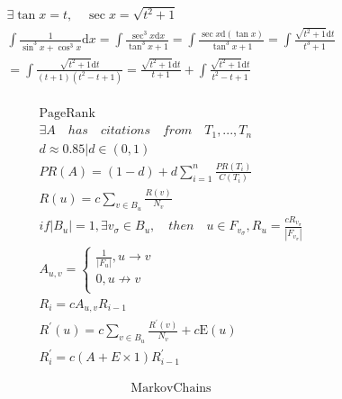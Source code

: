 \documentclass{article}
\begin{document}
\begin{align*}
    \exists \tan x = t, \quad \sec x = \sqrt{t^2+1}\\ 
    \int \frac{1}{\sin^3 x + \cos^3 x} \mathrm{d}x = \int \frac{\sec^3 x\mathrm{d}x}{\tan^3 x+1} = \int \frac{\sec x\mathrm{d}(\tan x)}{\tan^3 x + 1} = \int \frac{\sqrt{t^2 + 1}\mathrm{d}t}{t^3+1} \\ 
    = \int \frac{\sqrt{t^2 + 1}\mathrm{d}t}{(t+1)(t^2-t+1)} = \frac{\sqrt{t^2 + 1}\mathrm{d}t}{t+1} + \int \frac{\sqrt{t^2 + 1}\mathrm{d}t}{t^2-t+1}\\
\end{align*}

\clearpage

\begin{align*}
    \mathrm{PageRank}\\
    \exists A \quad has \quad citations \quad from \quad T_{1},...,T_{n}\\
    d \approx 0.85 | d \in (0,1) \\
    PR(A) = (1-d) + d\sum_{i=1}^{n}\frac{PR(T_{i})}{C(T_{i})} \\
    R(u) = c \sum_{v \in B_{u}} \frac{R(v)}{N_{v}}\\
    if |B_{u}| = 1, \exists v_{\sigma} \in B_{u},\quad then \quad u \in F_{v_{\sigma}},R_{u} = \frac{cR_{v_{\sigma}}}{|F_{v_{\sigma}}|}\\
    A_{u,v} = \left\{ 
    \begin{array}{rl} 
        \frac{1}{|F_{u}|},u \rightarrow v  \\ 
        0, u \nrightarrow v \\
    \end{array} \right. \ \\ 
    R_{i} = cA_{u,v}R_{i-1}\\
    R^{'}(u) = c\sum_{v \in B_{u}}\frac{R^{'}(v)}{N_{v}} + c\mathrm{E}(u)\\
    R^{'}_{i} = c(A + E \times \mathrm{1})R^{'}_{i-1}
\end{align*}

\begin{align*}
    \mathrm{Markov Chains}\\
\end{align*}
\end{document}
